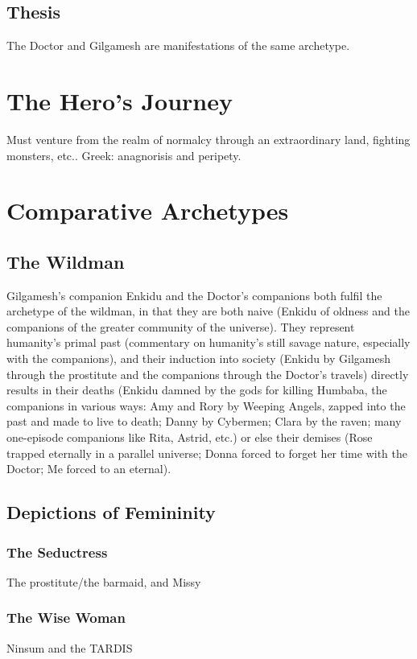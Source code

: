 \documentclass[10pt,a4paper]{article}
\begin{document}
\subsection{Thesis}
The Doctor and Gilgamesh are manifestations of the same archetype.



\section{The Hero's Journey}
    Must venture from the realm of normalcy through an extraordinary land, fighting monsters, etc.. Greek: anagnorisis and peripety.
    
    
 \section{Comparative Archetypes}     
 
\subsection{The Wildman}
    Gilgamesh's companion Enkidu and the Doctor's companions both fulfil the archetype of the wildman, in that they are both naive (Enkidu of oldness and the companions of the greater community of the universe). They represent humanity's primal past (commentary on humanity's still savage nature, especially with the companions), and their induction into society (Enkidu by Gilgamesh through the prostitute and the companions through the Doctor's travels) directly results in their deaths (Enkidu damned by the gods for killing Humbaba, the companions in various ways: Amy and Rory by Weeping Angels, zapped into the past and made to live to death; Danny by Cybermen; Clara by the raven; many one-episode companions like Rita, Astrid, etc.) or else their demises (Rose trapped eternally in a parallel universe; Donna forced to forget her time with the Doctor; Me forced to an eternal).
    
\subsection{Depictions of Femininity}
\subsubsection{The Seductress}
    The prostitute/the barmaid, and Missy 
\subsubsection{The Wise Woman}
    Ninsum and the TARDIS
\end{document}
